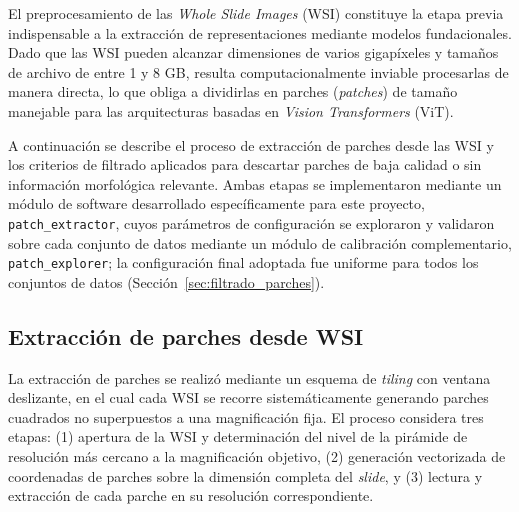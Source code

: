 El preprocesamiento de las \textit{Whole Slide Images} (WSI) constituye la etapa previa indispensable a la extracción de representaciones mediante modelos fundacionales. Dado que las WSI pueden alcanzar dimensiones de varios gigapíxeles y tamaños de archivo de entre 1 y 8 GB, resulta computacionalmente inviable procesarlas de manera directa, lo que obliga a dividirlas en parches (\textit{patches}) de tamaño manejable para las arquitecturas basadas en \textit{Vision Transformers} (ViT). 

A continuación se describe el proceso de extracción de parches desde las WSI y los criterios de filtrado aplicados para descartar parches de baja calidad o sin información morfológica relevante. Ambas etapas se implementaron mediante un módulo de software desarrollado específicamente para este proyecto, \texttt{patch\_extractor}, cuyos parámetros de configuración se exploraron y validaron sobre cada conjunto de datos mediante un módulo de calibración complementario, \texttt{patch\_explorer}; la configuración final adoptada fue uniforme para todos los conjuntos de datos (Sección~\ref{sec:filtrado_parches}).

\subsection{Extracción de parches desde WSI}
\label{sec:extraccion_parches}


La extracción de parches se realizó mediante un esquema de \textit{tiling} con ventana deslizante, en el cual cada WSI se recorre sistemáticamente generando parches cuadrados no superpuestos a una magnificación fija. El proceso considera tres etapas: (1) apertura de la WSI y determinación del nivel de la pirámide de resolución más cercano a la magnificación objetivo, (2) generación vectorizada de coordenadas de parches sobre la dimensión completa del \textit{slide}, y (3) lectura y extracción de cada parche en su resolución correspondiente.

